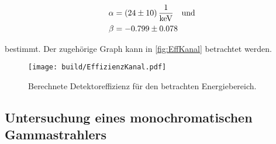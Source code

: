 \begin{align*}
    \alpha &= \SI{24 \pm 10}{\frac{1}{\kilo\eV}} \quad  \text{und} \\
    \beta  &= \num{-0.799 \pm 0.078}\\
\end{align*}
%

bestimmt.
Der zugehörige Graph kann in \autoref{fig:EffKanal} betrachtet werden.


\begin{figure}[H]
    \centering
    \texttt{[image: build/EffizienzKanal.pdf]}
    \caption{Berechnete Detektoreffizienz für den betrachten Energiebereich.}
    \label{fig:EffKanal}
\end{figure}

\subsection{Untersuchung eines monochromatischen Gammastrahlers}